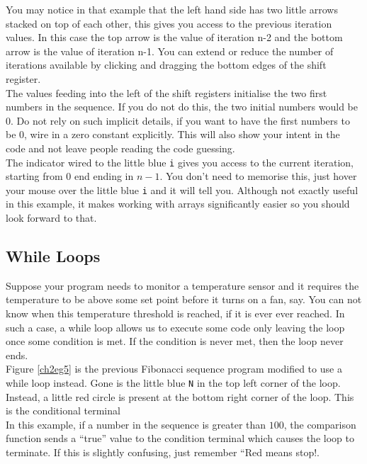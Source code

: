 You may notice in that example that the left hand side has two little arrows stacked on top of each other, this gives you access to the previous iteration values. In this case the top arrow is the value of iteration n-2 and the bottom arrow is the value of iteration n-1. You can extend or reduce the number of iterations available by clicking and dragging the bottom edges of the shift register.\\

The values feeding into the left of the shift registers initialise the two first numbers in the sequence. If you do not do this, the two initial numbers would be $0$. Do not rely on such implicit details, if you want to have the first numbers to be $0$, wire in a zero constant explicitly. This will also show your intent in the code and not leave people reading the code guessing.\\

The indicator wired to the little blue \texttt{i} gives you access to the current iteration, starting from $0$ end ending in $n-1$. You don't need to memorise this, just hover your mouse over the little blue \texttt{i} and it will tell you. Although not exactly useful in this example, it makes working with arrays significantly easier so you should look forward to that.\\

\subsection{While Loops}
Suppose your program needs to monitor a temperature sensor and it requires the temperature to be above some set point before it turns on a fan, say. You can not know when this temperature threshold is reached, if it is ever ever reached. In such a case, a while loop allows us to execute some code only leaving the loop once some condition is met. If the condition is never met, then the loop never ends.\\

Figure \ref{ch2eg5} is the previous Fibonacci sequence program modified to use a while loop instead. Gone is the little blue \texttt{N} in the top left corner of the loop. Instead, a little red circle is present at the bottom right corner of the loop. This is the conditional terminal\\

In this example, if a number in the sequence is greater than $100$, the comparison function sends a ``true'' value to the condition terminal which causes the loop to terminate. If this is slightly confusing, just remember ``Red means stop!. \\

